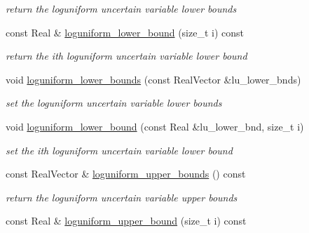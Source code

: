 \begin{DoxyCompactItemize}
\begin{DoxyCompactList}\small\item\em return the loguniform uncertain variable lower bounds \end{DoxyCompactList}\item 
const Real \& \hyperlink{classPecos_1_1AleatoryDistParams_ae6fd941a34b514d015b8c144cae788af}{loguniform\+\_\+lower\+\_\+bound} (size\+\_\+t i) const \label{classPecos_1_1AleatoryDistParams_ae6fd941a34b514d015b8c144cae788af}

\begin{DoxyCompactList}\small\item\em return the ith loguniform uncertain variable lower bound \end{DoxyCompactList}\item 
void \hyperlink{classPecos_1_1AleatoryDistParams_ab911cb47d5ee02aeb3247db088db0bcd}{loguniform\+\_\+lower\+\_\+bounds} (const Real\+Vector \&lu\+\_\+lower\+\_\+bnds)\label{classPecos_1_1AleatoryDistParams_ab911cb47d5ee02aeb3247db088db0bcd}

\begin{DoxyCompactList}\small\item\em set the loguniform uncertain variable lower bounds \end{DoxyCompactList}\item 
void \hyperlink{classPecos_1_1AleatoryDistParams_aa1e31ce094863d1b61a82f52f794d7c1}{loguniform\+\_\+lower\+\_\+bound} (const Real \&lu\+\_\+lower\+\_\+bnd, size\+\_\+t i)\label{classPecos_1_1AleatoryDistParams_aa1e31ce094863d1b61a82f52f794d7c1}

\begin{DoxyCompactList}\small\item\em set the ith loguniform uncertain variable lower bound \end{DoxyCompactList}\item 
const Real\+Vector \& \hyperlink{classPecos_1_1AleatoryDistParams_a58d84e5b566c6c62b0a61bfec98c04d6}{loguniform\+\_\+upper\+\_\+bounds} () const \label{classPecos_1_1AleatoryDistParams_a58d84e5b566c6c62b0a61bfec98c04d6}

\begin{DoxyCompactList}\small\item\em return the loguniform uncertain variable upper bounds \end{DoxyCompactList}\item 
const Real \& \hyperlink{classPecos_1_1AleatoryDistParams_afbcab1d31e9c6b9d3880606fb4ef9243}{loguniform\+\_\+upper\+\_\+bound} (size\+\_\+t i) const \label{classPecos_1_1AleatoryDistParams_afbcab1d31e9c6b9d3880606fb4ef9243}


\end{DoxyCompactItemize}
